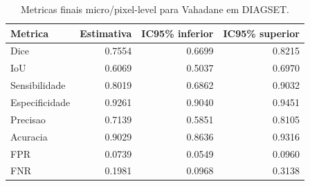 \begin{table}[!htb]
\centering
\caption{Metricas finais micro/pixel-level para Vahadane em DIAGSET.}
\label{tab:results_diagset-micro-vahadane}
\small
\begin{tabular}{lrrr}
\toprule
Metrica & Estimativa & IC95\% inferior & IC95\% superior \\
\midrule
Dice & 0.7554 & 0.6699 & 0.8215 \\
IoU & 0.6069 & 0.5037 & 0.6970 \\
Sensibilidade & 0.8019 & 0.6862 & 0.9032 \\
Especificidade & 0.9261 & 0.9040 & 0.9451 \\
Precisao & 0.7139 & 0.5851 & 0.8105 \\
Acuracia & 0.9029 & 0.8636 & 0.9316 \\
FPR & 0.0739 & 0.0549 & 0.0960 \\
FNR & 0.1981 & 0.0968 & 0.3138 \\
\bottomrule
\end{tabular}
\end{table}
